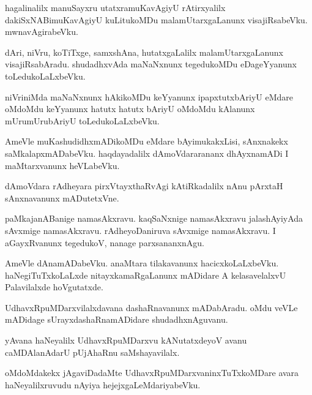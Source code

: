 \begin{mng}
hagalinalilx manuSayxru utatxramuKavAgiyU rAtirxyalilx dakiSxNABimuKavAgiyU kuLitukoMDu malamUtarxgaLanunx visajiRsabeVku. mwnavAgirabeVku.
\end{mng}

\begin{mng}
dAri, niVru, koTiTxge, samxshAna, hutatxgaLalilx malamUtarxgaLanunx visajiRsabAradu. shudadhxvAda maNaNxnunx tegedukoMDu eDageYyanunx toLedukoLaLxbeVku.
\end{mng}

\begin{mng}
niVriniMda maNaNxnunx hAkikoMDu keYyanunx ipapxtutxbAriyU eMdare oMdoMdu keYyanunx hatutx hatutx bAriyU oMdoMdu kAlanunx mUrumUrubAriyU toLedukoLaLxbeVku.
\end{mng}

\begin{mng}
AmeVle muKashudidhxmADikoMDu eMdare bAyimukakxLisi, sAnxnakekx saMkalapxmADabeVku. haqdayadalilx dAmoVdararananx dhAyxnamADi I maMtarxvanunx heVLabeVku.
\end{mng}

\begin{mng}
dAmoVdara rAdheyara pirxVtayxthaRvAgi kAtiRkadalilx nAnu pArxtaH sAnxnavanunx mADutetxVne.
\end{mng}

\begin{mng}
paMkajanABanige namasAkxravu. kaqSaNxnige namasAkxravu jalashAyiyAda sAvxmige namasAkxravu. rAdheyoDaniruva sAvxmige namasAkxravu. I aGayxRvanunx tegedukoV, nanage parxsananxnAgu.
\end{mng}

\begin{mng}
AmeVle dAnamADabeVku. anaMtara tilakavanunx hacicxkoLaLxbeVku. haNegiTuTxkoLaLxde nitayxkamaRgaLanunx mADidare A kelasavelalxvU Palavilalxde hoVgutatxde.
\end{mng}

\begin{mng}
UdhavxRpuMDarxvilalxdavana dashaRnavanunx mADabAradu. oMdu veVLe mADidage sUrayxdashaRnamADidare shudadhxnAguvanu.
\end{mng}

\begin{mng}
yAvana haNeyalilx UdhavxRpuMDarxvu kANutatxdeyoV avanu caMDAlanAdarU pUjAhaRnu saMshayavilalx.
\end{mng}

\begin{mng}
oMdoMdakekx jAgaviDadaMte UdhavxRpuMDarxvaninxTuTxkoMDare avara haNeyalilxruvudu nAyiya hejejxgaLeMdariyabeVku.
\end{mng}

